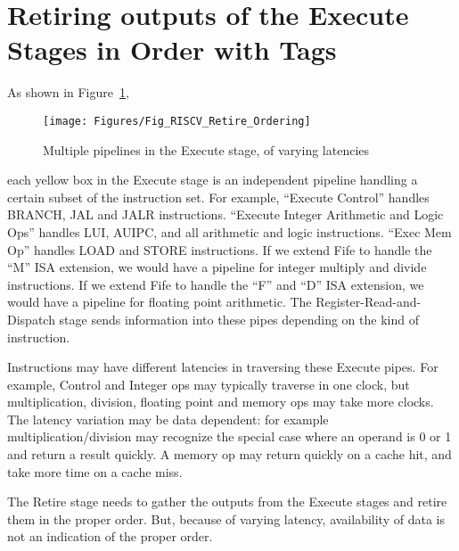 
\section{Retiring outputs of the Execute Stages in Order with Tags}

\label{Sec_Reorder_Tags}


As shown in Figure~\ref{Fig_RISCV_Retire_Ordering},
\begin{figure}[htbp]
  \centerline{\texttt{[image: Figures/Fig\_RISCV\_Retire\_Ordering]}}
  \caption{\label{Fig_RISCV_Retire_Ordering}
           Multiple pipelines in the Execute stage, of varying latencies}
\end{figure}
each yellow box in
the Execute stage is an independent pipeline handling a certain subset
of the instruction set.  For example, ``Execute Control'' handles
BRANCH, JAL and JALR instructions. ``Execute Integer Arithmetic and
Logic Ops'' handles LUI, AUIPC, and all arithmetic and logic
instructions.  ``Exec Mem Op'' handles LOAD and STORE instructions.
If we extend Fife to handle the ``M'' ISA extension, we would have a
pipeline for integer multiply and divide instructions.  If we extend
Fife to handle the ``F'' and ``D'' ISA extension, we would have a
pipeline for floating point arithmetic.  The
Register-Read-and-Dispatch stage sends information into these pipes
depending on the kind of instruction.

Instructions may have different latencies in traversing these Execute
pipes.  For example, Control and Integer ops may typically traverse in
one clock, but multiplication, division, floating point and memory ops
may take more clocks.  The latency variation may be data dependent:
for example multiplication/division may recognize the special case
where an operand is 0 or 1 and return a result quickly.  A memory op
may return quickly on a cache hit, and take more time on a cache miss.

The Retire stage needs to gather the outputs from the Execute stages
and retire them in the proper order.  But, because of varying latency,
availability of data is not an indication of the proper order.


